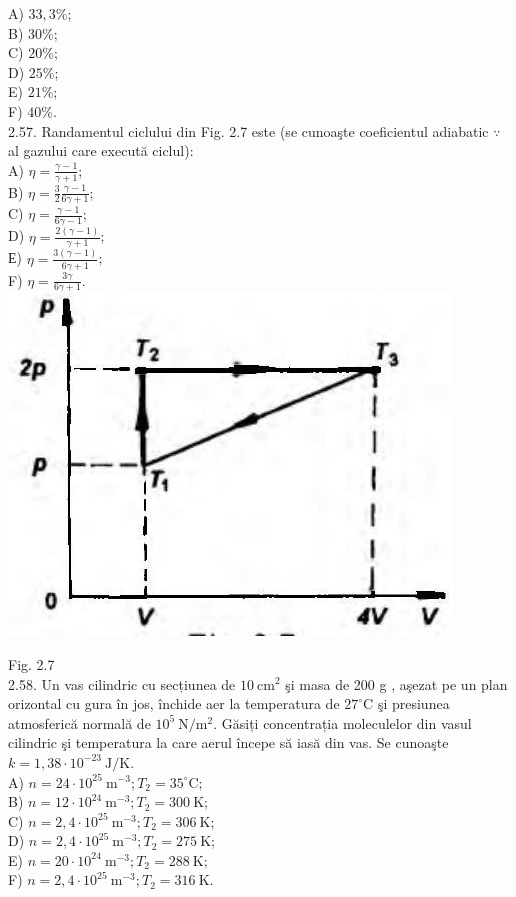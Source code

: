 \documentclass[10pt]{article}
\begin{document}
A) $33,3 \%$;\\
B) $30 \%$;\\
C) $20 \%$;\\
D) $25 \%$;\\
E) $21 \%$;\\
F) $40 \%$.\\
2.57. Randamentul ciclului din Fig. 2.7 este (se cunoaşte coeficientul adiabatic $\because$ al gazului care execută ciclul):\\
A) $\eta=\frac{\gamma-1}{\gamma+1}$;\\
B) $\eta=\frac{3}{2} \frac{\gamma-1}{6 \gamma+1}$;\\
C) $\eta=\frac{\gamma-1}{6 \gamma-1}$;\\
D) $\eta=\frac{2(\gamma-1)}{\gamma+1}$;\\
Е) $\eta=\frac{3(\gamma-1)}{6 \gamma+1}$;\\
F) $\eta=\frac{3 \gamma}{6 \gamma+1}$.\\
\includegraphics[max width=\textwidth, center]{2025_07_01_5b3ff9fa0d508c8e9f17g-085}

Fig. 2.7\\
2.58. Un vas cilindric cu secțiunea de $10 \mathrm{~cm}^{2}$ şi masa de 200 g , aşezat pe un plan orizontal cu gura în jos, închide aer la temperatura de $27^{\circ} \mathrm{C}$ şi presiunea atmosferică normală de $10^{5} \mathrm{~N} / \mathrm{m}^{2}$. Găsiți concentrația moleculelor din vasul cilindric şi temperatura la care aerul începe să iasă din vas. Se cunoaşte $k=1,38 \cdot 10^{-23} \mathrm{~J} / \mathrm{K}$.\\
A) $n=24 \cdot 10^{25} \mathrm{~m}^{-3} ; T_{2}=35^{\circ} \mathrm{C}$;\\
B) $n=12 \cdot 10^{24} \mathrm{~m}^{-3} ; T_{2}=300 \mathrm{~K}$;\\
C) $n=2,4 \cdot 10^{25} \mathrm{~m}^{-3} ; T_{2}=306 \mathrm{~K}$;\\
D) $n=2,4 \cdot 10^{25} \mathrm{~m}^{-3} ; T_{2}=275 \mathrm{~K}$;\\
E) $n=20 \cdot 10^{24} \mathrm{~m}^{-3} ; T_{2}=288 \mathrm{~K}$;\\
F) $n=2,4 \cdot 10^{25} \mathrm{~m}^{-3} ; T_{2}=316 \mathrm{~K}$.
\end{document}
